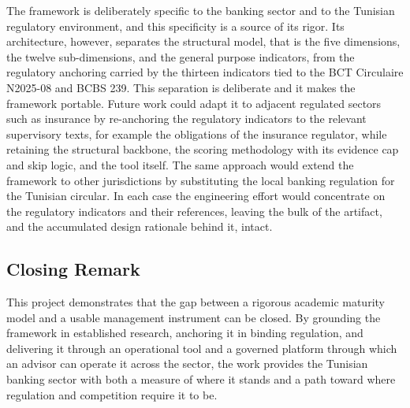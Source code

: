 The framework is deliberately specific to the banking sector and to the Tunisian regulatory environment, and this specificity is a source of its rigor. Its architecture, however, separates the structural model, that is the five dimensions, the twelve sub-dimensions, and the general purpose indicators, from the regulatory anchoring carried by the thirteen indicators tied to the BCT Circulaire N\textdegree{}2025-08 and BCBS 239. This separation is deliberate and it makes the framework portable. Future work could adapt it to adjacent regulated sectors such as insurance by re-anchoring the regulatory indicators to the relevant supervisory texts, for example the obligations of the insurance regulator, while retaining the structural backbone, the scoring methodology with its evidence cap and skip logic, and the tool itself. The same approach would extend the framework to other jurisdictions by substituting the local banking regulation for the Tunisian circular. In each case the engineering effort would concentrate on the regulatory indicators and their references, leaving the bulk of the artifact, and the accumulated design rationale behind it, intact.

\subsection{Closing Remark}

This project demonstrates that the gap between a rigorous academic maturity model and a usable management instrument can be closed. By grounding the framework in established research, anchoring it in binding regulation, and delivering it through an operational tool and a governed platform through which an advisor can operate it across the sector, the work provides the Tunisian banking sector with both a measure of where it stands and a path toward where regulation and competition require it to be.
